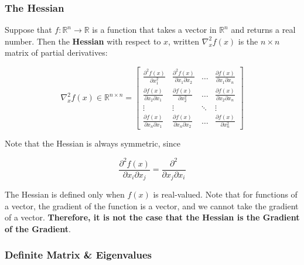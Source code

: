 \documentclass{article}
\begin{document}
\subsubsection{The Hessian}

\begin{definition}
    
Suppose that $f: \mathbb{R}^{n}\to \mathbb{R}$ is a function that takes a vector in $\mathbb{R}^{n}$ and returns a real number. Then the \textbf{Hessian} with respect to $x$, written $\nabla^{2}_x f(x)$ is the $n\times n$ matrix of partial derivatives:


\begin{equation}
    \nabla^{2}_x f(x) \in \mathbb{R}^{n\times n} = \begin{bmatrix}
        \frac{\partial^{2} f(x)}{\partial x^{2}_{1}} & \frac{\partial^{2} f(x)}{\partial x_{1}\partial x_{2}} & \dots & \frac{\partial f(x)}{\partial x_{1} \partial x_n} \\ 
        \frac{\partial f(x)}{\partial x_{2} \partial x_{1}} & \frac{\partial f(x)}{\partial x^{2}_{2}} & \dots & \frac{\partial f(x)}{\partial x_{2} \partial x_n} \\ 
        \vdots & \vdots & \ddots & \vdots \\ 
        \frac{\partial f(x)}{\partial x_{n} \partial x_{1}} & \frac{\partial f(x)}{\partial x_{n} \partial x_{2}} &  \dots & \frac{\partial f(x)}{\partial x^{2}_{n}}
    \end{bmatrix}
\end{equation}

\end{definition}

\noindent Note that the Hessian is always symmetric, since 

\begin{equation*}
    \frac{\partial^{2} f(x)}{\partial x_i \partial x_j} = \frac{\partial^{2}}{\partial x_j \partial x_i}
\end{equation*}

\noindent The Hessian is defined only when $f(x)$ is real-valued. Note that for functions of a vector, the gradient of the function is a vector, and we cannot take the gradient of a vector.\textbf{ Therefore, it is not the case that the Hessian is the Gradient of the Gradient}. 

\subsubsection{Definite Matrix \& Eigenvalues}
\end{document}
